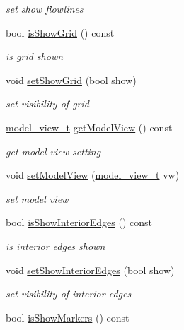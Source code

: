 \begin{DoxyCompactItemize}
\begin{DoxyCompactList}\small\item\em set show flowlines \end{DoxyCompactList}\item 
bool \hyperlink{classShipCAD_1_1Visibility_a9aa81550e01813b9ec84b40aba5f904e}{is\-Show\-Grid} () const 
\begin{DoxyCompactList}\small\item\em is grid shown \end{DoxyCompactList}\item 
void \hyperlink{classShipCAD_1_1Visibility_a57b601879f10927beb3d466c211e6ee6}{set\-Show\-Grid} (bool show)
\begin{DoxyCompactList}\small\item\em set visibility of grid \end{DoxyCompactList}\item 
\hyperlink{namespaceShipCAD_a742f9cd95e62e207769e17467ecd5bb7}{model\-\_\-view\-\_\-t} \hyperlink{classShipCAD_1_1Visibility_a34d56f9e9467b9749c6b50adfe8a0493}{get\-Model\-View} () const 
\begin{DoxyCompactList}\small\item\em get model view setting \end{DoxyCompactList}\item 
void \hyperlink{classShipCAD_1_1Visibility_a017115fc25ec3a7363033dcca873f38f}{set\-Model\-View} (\hyperlink{namespaceShipCAD_a742f9cd95e62e207769e17467ecd5bb7}{model\-\_\-view\-\_\-t} vw)
\begin{DoxyCompactList}\small\item\em set model view \end{DoxyCompactList}\item 
bool \hyperlink{classShipCAD_1_1Visibility_a63588a3b8aa0a7dd37b19173a4802b47}{is\-Show\-Interior\-Edges} () const 
\begin{DoxyCompactList}\small\item\em is interior edges shown \end{DoxyCompactList}\item 
void \hyperlink{classShipCAD_1_1Visibility_a2ce6cd0c56750e6638b5e195e6bc5590}{set\-Show\-Interior\-Edges} (bool show)
\begin{DoxyCompactList}\small\item\em set visibility of interior edges \end{DoxyCompactList}\item 
bool \hyperlink{classShipCAD_1_1Visibility_adae35f2eb31f5d468674ab9856a39637}{is\-Show\-Markers} () const 

\end{DoxyCompactItemize}
